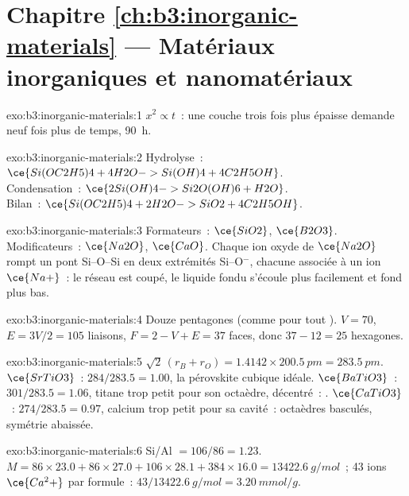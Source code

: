 \section*{Chapitre \ref{ch:b3:inorganic-materials} --- Matériaux inorganiques et nanomatériaux}

\begin{solution}{exo:b3:inorganic-materials:1}
$x^2 \propto t$~: une couche trois fois plus épaisse demande neuf fois plus de temps, \qty{90}{h}.
\end{solution}

\begin{solution}{exo:b3:inorganic-materials:2}
Hydrolyse~: $\ce{Si(OC2H5)4 + 4H2O -> Si(OH)4 + 4C2H5OH}$.\\
Condensation~: $\ce{2Si(OH)4 -> Si2O(OH)6 + H2O}$.\\
Bilan~: $\ce{Si(OC2H5)4 + 2H2O -> SiO2 + 4C2H5OH}$.
\end{solution}

\begin{solution}{exo:b3:inorganic-materials:3}
Formateurs~: $\ce{SiO2}$, $\ce{B2O3}$. Modificateurs~: $\ce{Na2O}$, $\ce{CaO}$. Chaque ion oxyde de $\ce{Na2O}$ rompt un pont Si--O--Si
en deux extrémités Si--O$^-$, chacune associée à un ion $\ce{Na+}$~: le réseau est coupé, le liquide fondu
s'écoule plus facilement et fond plus bas.
\end{solution}

\begin{solution}{exo:b3:inorganic-materials:4}
Douze pentagones (comme pour tout ). $V = 70$, $E = 3V/2 = 105$ liaisons, $F = 2 - V + E = 37$
faces, donc $37 - 12 = 25$ hexagones.
\end{solution}

\begin{solution}{exo:b3:inorganic-materials:5}
$\sqrt2\,(r_B + r_O) = 1.4142 \times \qty{200.5}{pm} = \qty{283.5}{pm}$. $\ce{SrTiO3}$~: $284/283.5 = 1.00$, la pérovskite cubique idéale.
$\ce{BaTiO3}$~: $301/283.5 = 1.06$, titane trop petit pour son octaèdre, décentré~: .
$\ce{CaTiO3}$~: $274/283.5 = 0.97$, calcium trop petit pour sa cavité~: octaèdres basculés, symétrie
abaissée.
\end{solution}

\begin{solution}{exo:b3:inorganic-materials:6}
Si/Al $= 106/86 = 1.23$. $M = 86 \times 23.0 + 86 \times 27.0 + 106 \times 28.1 + 384 \times 16.0 = \qty{13422.6}{g/mol}$~; 43 ions $\ce{Ca^2+}$ par
formule~: $43/\qty{13422.6}{g/mol} = \qty{3.20}{mmol/g}$.
\end{solution}


